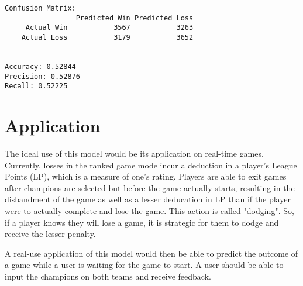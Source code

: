 \documentclass[11pt]{article}
\begin{document}
    \begin{Verbatim}[commandchars=\\\{\}]
Confusion Matrix:
                 Predicted Win Predicted Loss
     Actual Win           3567           3263
    Actual Loss           3179           3652


Accuracy: 0.52844
Precision: 0.52876
Recall: 0.52225

    \end{Verbatim}

    \section{Application}\label{application}

    The ideal use of this model would be its application on real-time games.
Currently, losses in the ranked game mode incur a deduction in a
player's League Points (LP), which is a measure of one's rating. Players
are able to exit games after champions are selected but before the game
actually starts, resulting in the disbandment of the game as well as a
lesser deducation in LP than if the player were to actually complete and
lose the game. This action is called "dodging". So, if a player knows
they will lose a game, it is strategic for them to dodge and receive the
lesser penalty.

A real-use application of this model would then be able to predict the
outcome of a game while a user is waiting for the game to start. A user
should be able to input the champions on both teams and receive
feedback.
\end{document}
